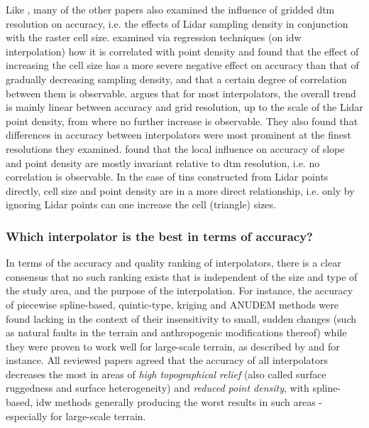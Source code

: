 Like \cite{aguilar_etal_2010}, many of the other papers also examined the influence of gridded \ac{dtm} resolution on accuracy, i.e. the effects of Lidar sampling density in conjunction with the raster cell size. \cite{chow_hodgson_2009} examined via regression techniques (on \ac{idw} interpolation) how it is correlated with point density and found that the effect of increasing the cell size has a more severe negative effect on accuracy than that of gradually decreasing sampling density, and that a certain degree of correlation between them is observable. \cite{guo_etal_2010} argues that for most interpolators, the overall trend is mainly linear between accuracy and grid resolution, up to the scale of the Lidar point density, from where no further increase is observable. They also found that differences in accuracy between interpolators were most prominent at the finest resolutions they examined. \cite{bater_coops_2009} found that the local influence on accuracy of slope and point density are mostly invariant relative to \ac{dtm} resolution, i.e. no correlation is observable. In the case of \ac{tin}s constructed from Lidar points directly, cell size and point density are in a more direct relationship, i.e. only by ignoring Lidar points can one increase the cell (triangle) sizes.

\subsubsection{Which interpolator is the best in terms of accuracy?}

In terms of the accuracy and quality ranking of interpolators, there is a clear consensus that no such ranking exists that is independent of the size and type of the study area, and the purpose of the interpolation. For instance, the accuracy of piecewise spline-based, quintic-type, kriging and ANUDEM methods were found lacking in the context of their insensitivity to small, sudden changes (such as natural faults in the terrain and anthropogenic modifications thereof) while they were proven to work well for large-scale terrain, as described by \cite{bater_coops_2009} and \cite{guo_etal_2010} for instance. All reviewed papers agreed that the accuracy of all interpolators decreases the most in areas of \textit{high topographical relief} (also called surface ruggedness and surface heterogeneity) and \textit{reduced point density}, with spline-based, \ac{idw} methods generally producing the worst results in such areas - especially for large-scale terrain.

